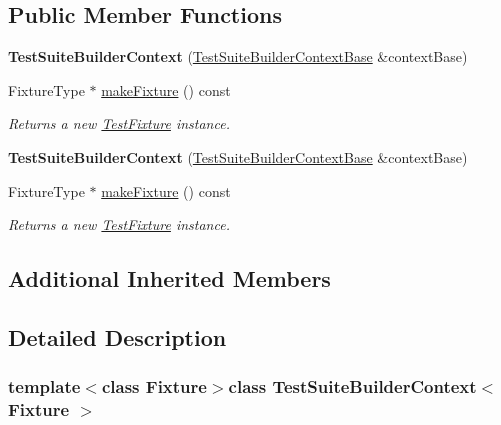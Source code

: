 \subsection*{Public Member Functions}
\begin{DoxyCompactItemize}
\item 
\hypertarget{class_test_suite_builder_context_a51c0c0c846df2790ea1866c61e9b3e39}{{\bfseries Test\+Suite\+Builder\+Context} (\hyperlink{class_test_suite_builder_context_base}{Test\+Suite\+Builder\+Context\+Base} \&context\+Base)}\label{class_test_suite_builder_context_a51c0c0c846df2790ea1866c61e9b3e39}

\item 
Fixture\+Type $\ast$ \hyperlink{class_test_suite_builder_context_a8f5c2fa277582411aa49bfbbe6d72d11}{make\+Fixture} () const 
\begin{DoxyCompactList}\small\item\em Returns a new \hyperlink{class_test_fixture}{Test\+Fixture} instance. \end{DoxyCompactList}\item 
\hypertarget{class_test_suite_builder_context_a51c0c0c846df2790ea1866c61e9b3e39}{{\bfseries Test\+Suite\+Builder\+Context} (\hyperlink{class_test_suite_builder_context_base}{Test\+Suite\+Builder\+Context\+Base} \&context\+Base)}\label{class_test_suite_builder_context_a51c0c0c846df2790ea1866c61e9b3e39}

\item 
Fixture\+Type $\ast$ \hyperlink{class_test_suite_builder_context_a8f5c2fa277582411aa49bfbbe6d72d11}{make\+Fixture} () const 
\begin{DoxyCompactList}\small\item\em Returns a new \hyperlink{class_test_fixture}{Test\+Fixture} instance. \end{DoxyCompactList}\end{DoxyCompactItemize}
\subsection*{Additional Inherited Members}


\subsection{Detailed Description}
\subsubsection*{template$<$class Fixture$>$class Test\+Suite\+Builder\+Context$<$ Fixture $>$}

